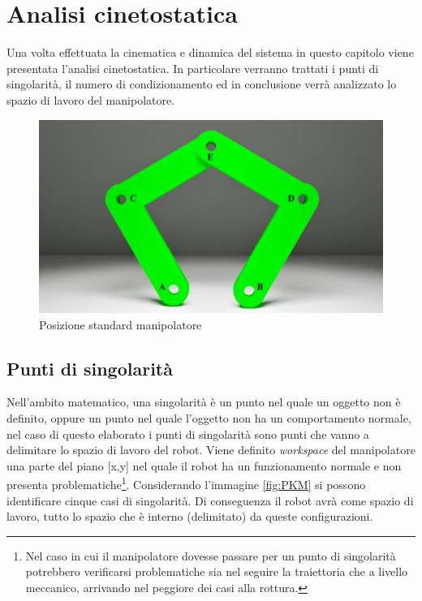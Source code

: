 \section{Analisi cinetostatica}
Una volta effettuata la cinematica e dinamica del sistema in questo capitolo viene presentata l'analisi cinetostatica. In particolare verranno trattati i punti di singolarità, il numero di condizionamento ed in conclusione verrà analizzato lo spazio di lavoro del manipolatore.
\begin{figure}[ht]
	\begin{center}
		\includegraphics[scale=0.3]{Immagini/Singolarity/0}
		\caption{Posizione standard manipolatore}
	\end{center}
\end{figure}
\subsection{Punti di singolarità}\label{puntiSingcap}
Nell'ambito matematico, una singolarità è un punto nel quale un oggetto non è definito, oppure un punto nel quale l'oggetto non ha un comportamento normale, nel caso di questo elaborato i punti di singolarità sono punti che vanno a delimitare lo spazio di lavoro del robot. Viene definito \textit{workspace} del manipolatore una parte del piano [x,y] nel quale il robot ha un funzionamento normale e non presenta problematiche\footnote{Nel caso in cui il manipolatore dovesse passare per un punto di singolarità potrebbero verificarsi problematiche sia nel seguire la traiettoria che a livello meccanico, arrivando nel peggiore dei casi alla rottura.}. Considerando l'immagine \ref{fig:PKM} si possono identificare cinque casi di singolarità. Di conseguenza il robot avrà come spazio di lavoro, tutto lo spazio che è interno (delimitato) da queste configurazioni.
